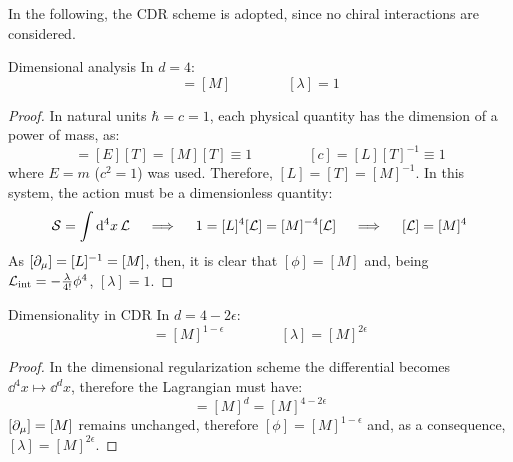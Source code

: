 In the following, the CDR scheme is adopted, since no chiral interactions are considered.

\begin{proposition}{Dimensional analysis}{}
  In $ d = 4 $:
  \begin{equation}
    [\phi] = [M]
    \qquad \qquad
    [\lambda] = 1
  \end{equation}
\end{proposition}

\begin{proofbox}
  \begin{proof}
    In natural units $ \hbar = c = 1 $, each physical quantity has the dimension of a power of mass, as:
    \begin{equation*}
      [\hbar] = [E] [T] = [M] [T] \equiv 1
      \qquad \qquad
      [c] = [L] [T]^{-1} \equiv 1
    \end{equation*}
    where $ E = m $ ($ c^2 = 1 $) was used. Therefore, $ [L] = [T] = [M]^{-1} $. In this system, the action must be a dimensionless quantity:
    \begin{equation*}
      \mathcal{S} = \int \mathrm{d}^4x \,\mathcal{L}
      \quad \implies \quad
      1 = [L]^4 [\mathcal{L}] = [M]^{-4} [\mathcal{L}]
      \quad \implies \quad
      [\mathcal{L}] = [M]^4
    \end{equation*}
    As $ [\partial_\mu] = [L]^{-1} = [M] $, then, it is clear that $ [\phi] = [M] $ and, being $ \mathcal{L}_\text{int} = - \frac{\lambda}{4!} \phi^4 $, $ [\lambda] = 1 $.
  \end{proof}
\end{proofbox}

\begin{proposition}{Dimensionality in CDR}{}
  In $ d = 4 - 2\epsilon $:
  \begin{equation}
    [\phi] = [M]^{1 - \epsilon}
    \qquad \qquad
    [\lambda] = [M]^{2\epsilon}
  \end{equation}
\end{proposition}

\begin{proofbox}
  \begin{proof}
    In the dimensional regularization scheme the differential becomes $ \dd^4x \mapsto \dd^dx $, therefore the Lagrangian must have:
    \begin{equation*}
      [\lag] = [M]^d = [M]^{4 - 2\epsilon}
    \end{equation*}
    $ [\partial_\mu] = [M] $ remains unchanged, therefore $ [\phi] = [M]^{1 - \epsilon} $ and, as a consequence, $ [\lambda] = [M]^{2\epsilon} $.
  \end{proof}
\end{proofbox}

